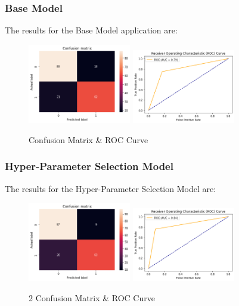 \documentclass[conference]{IEEEtran}
\begin{document}
\subsubsection{Base Model}
The results for the Base Model application are:

\begin{figure}[h!]
    \includegraphics[width=4.5cm]{DT/dt1_1.png}%
    \includegraphics[width=4.5cm]{DT/dt1_2.png}%
    \caption{Confusion Matrix & ROC Curve}%
    \label{fig:conf_DT_1}%
\end{figure}

\subsubsection{Hyper-Parameter Selection Model}

The results for the Hyper-Parameter Selection Model are:

\begin{figure}[h!]
    \includegraphics[width=4.5cm]{DT/dt2_1.png}%
    \includegraphics[width=4.5cm]{DT/dt2_2.png}%
    \caption{2 Confusion Matrix & ROC Curve}%
    \label{fig:conf_DT_2}%
\end{figure}
\end{document}
